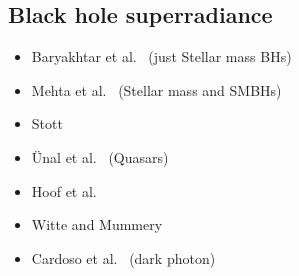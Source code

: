\documentclass[8pt,twocolumn]{extarticle}
\begin{document}
\begin{mdframed}
\subsection{Black hole superradiance}\vspace{-0.5em}
\begin{itemize}\setlength\itemsep{-0.5em}
	\item Baryakhtar et al.~\cite{Baryakhtar:2020gao} (just Stellar mass BHs)
	\item Mehta et al.~\cite{Baryakhtar:2020gao} (Stellar mass and SMBHs)
	\item Stott~\cite{Stott:2020gjj}
	\item \"Unal et al.~\cite{Unal:2020jiy} (Quasars)
	\item Hoof et al.~\cite{Hoof:2024quk}
	\item Witte and Mummery~\cite{Witte:2024drg}
	\item Cardoso et al.~\cite{Cardoso:2018tly} (dark photon)
\end{itemize}


\end{mdframed}
\end{document}

